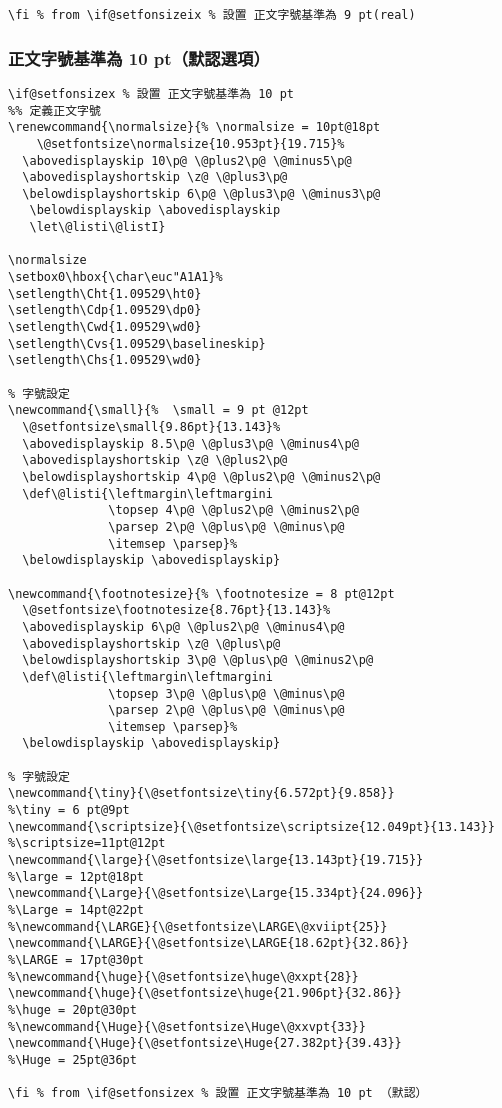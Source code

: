 \begin{lstlisting}[firstnumber=199]
\fi % from \if@setfonsizeix % 設置 正文字號基準為 9 pt(real)

\end{lstlisting}


\subsubsection{正文字號基準為 10 pt（默認選項）}
\begin{lstlisting}[firstnumber=254]
\if@setfonsizex % 設置 正文字號基準為 10 pt
%% 定義正文字號
\renewcommand{\normalsize}{% \normalsize = 10pt@18pt
    \@setfontsize\normalsize{10.953pt}{19.715}%
  \abovedisplayskip 10\p@ \@plus2\p@ \@minus5\p@
  \abovedisplayshortskip \z@ \@plus3\p@
  \belowdisplayshortskip 6\p@ \@plus3\p@ \@minus3\p@
   \belowdisplayskip \abovedisplayskip
   \let\@listi\@listI}

\normalsize
\setbox0\hbox{\char\euc"A1A1}%
\setlength\Cht{1.09529\ht0}
\setlength\Cdp{1.09529\dp0}
\setlength\Cwd{1.09529\wd0}
\setlength\Cvs{1.09529\baselineskip}
\setlength\Chs{1.09529\wd0}

% 字號設定
\newcommand{\small}{%  \small = 9 pt @12pt
  \@setfontsize\small{9.86pt}{13.143}%
  \abovedisplayskip 8.5\p@ \@plus3\p@ \@minus4\p@
  \abovedisplayshortskip \z@ \@plus2\p@
  \belowdisplayshortskip 4\p@ \@plus2\p@ \@minus2\p@
  \def\@listi{\leftmargin\leftmargini
              \topsep 4\p@ \@plus2\p@ \@minus2\p@
              \parsep 2\p@ \@plus\p@ \@minus\p@
              \itemsep \parsep}%
  \belowdisplayskip \abovedisplayskip}

\newcommand{\footnotesize}{% \footnotesize = 8 pt@12pt
  \@setfontsize\footnotesize{8.76pt}{13.143}%
  \abovedisplayskip 6\p@ \@plus2\p@ \@minus4\p@
  \abovedisplayshortskip \z@ \@plus\p@
  \belowdisplayshortskip 3\p@ \@plus\p@ \@minus2\p@
  \def\@listi{\leftmargin\leftmargini
              \topsep 3\p@ \@plus\p@ \@minus\p@
              \parsep 2\p@ \@plus\p@ \@minus\p@
              \itemsep \parsep}%
  \belowdisplayskip \abovedisplayskip}

% 字號設定
\newcommand{\tiny}{\@setfontsize\tiny{6.572pt}{9.858}}					 			   %\tiny = 6 pt@9pt
\newcommand{\scriptsize}{\@setfontsize\scriptsize{12.049pt}{13.143}}		 %\scriptsize=11pt@12pt
\newcommand{\large}{\@setfontsize\large{13.143pt}{19.715}}				   	   %\large = 12pt@18pt
\newcommand{\Large}{\@setfontsize\Large{15.334pt}{24.096}}				   	   %\Large = 14pt@22pt
%\newcommand{\LARGE}{\@setfontsize\LARGE\@xviipt{25}}
\newcommand{\LARGE}{\@setfontsize\LARGE{18.62pt}{32.86}}  			  			 %\LARGE = 17pt@30pt
%\newcommand{\huge}{\@setfontsize\huge\@xxpt{28}}
\newcommand{\huge}{\@setfontsize\huge{21.906pt}{32.86}}    				 			 %\huge = 20pt@30pt
%\newcommand{\Huge}{\@setfontsize\Huge\@xxvpt{33}}
\newcommand{\Huge}{\@setfontsize\Huge{27.382pt}{39.43}}   						   %\Huge = 25pt@36pt

\fi % from \if@setfonsizex % 設置 正文字號基準為 10 pt （默認）
\end{lstlisting}

